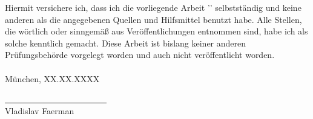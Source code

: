 
 
Hiermit versichere ich, dass ich die vorliegende Arbeit '\themaT' selbstständig und keine anderen als die angegebenen Quellen und Hilfsmittel benutzt habe. Alle Stellen, die wörtlich oder sinngemäß aus Veröffentlichungen entnommen sind, habe ich als solche kenntlich gemacht. Diese Arbeit ist bislang keiner anderen Prüfungsbehörde vorgelegt worden und auch nicht veröffentlicht worden.
\\\\München, XX.XX.XXXX

\vskip 1.5cm

\underline{~~~~~~~~~~~~~~~~~~~~~~~~}\\
Vladislav Faerman\\